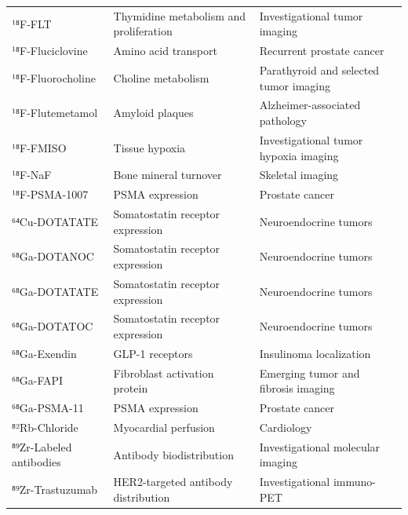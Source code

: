 \begin{longtable}{@{}p{}p{}p{}@{}}
¹⁸F-FLT & Thymidine metabolism and proliferation & Investigational tumor imaging \\
¹⁸F-Fluciclovine & Amino acid transport & Recurrent prostate cancer \\
¹⁸F-Fluorocholine & Choline metabolism & Parathyroid and selected tumor imaging \\
¹⁸F-Flutemetamol & Amyloid plaques & Alzheimer-associated pathology \\
¹⁸F-FMISO & Tissue hypoxia & Investigational tumor hypoxia imaging \\
¹⁸F-NaF & Bone mineral turnover & Skeletal imaging \\
¹⁸F-PSMA-1007 & PSMA expression & Prostate cancer \\
⁶⁴Cu-DOTATATE & Somatostatin receptor expression & Neuroendocrine tumors \\
⁶⁸Ga-DOTANOC & Somatostatin receptor expression & Neuroendocrine tumors \\
⁶⁸Ga-DOTATATE & Somatostatin receptor expression & Neuroendocrine tumors \\
⁶⁸Ga-DOTATOC & Somatostatin receptor expression & Neuroendocrine tumors \\
⁶⁸Ga-Exendin & GLP-1 receptors & Insulinoma localization \\
⁶⁸Ga-FAPI & Fibroblast activation protein & Emerging tumor and fibrosis imaging \\
⁶⁸Ga-PSMA-11 & PSMA expression & Prostate cancer \\
⁸²Rb-Chloride & Myocardial perfusion & Cardiology \\
⁸⁹Zr-Labeled antibodies & Antibody biodistribution & Investigational molecular imaging \\
⁸⁹Zr-Trastuzumab & HER2-targeted antibody distribution & Investigational immuno-PET \\
\bottomrule
\end{longtable}

